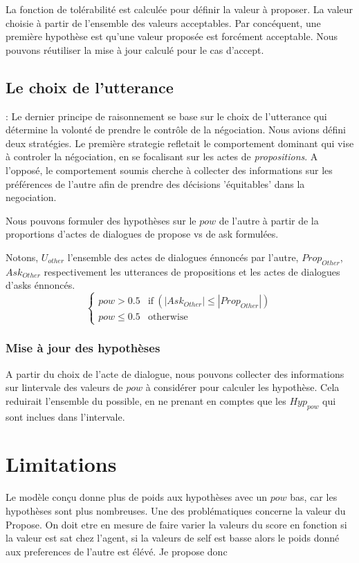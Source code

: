 \documentclass[runningheads,a4paper]{llncs}
\begin{document}
La fonction de tolérabilité est calculée pour définir la valeur à proposer. La valeur choisie à partir de l'ensemble des valeurs acceptables. Par concéquent, une première hypothèse est qu'une valeur proposée est forcément acceptable. Nous pouvons réutiliser la mise à jour calculé pour le cas d'accept.

\subsection{Le choix de l'utterance}: 
Le dernier principe de raisonnement se base sur le choix de l'utterance qui détermine la volonté de prendre le contrôle de la négociation. Nous avions défini deux stratégies. Le première strategie refletait le comportement dominant qui vise à controler la négociation, en se focalisant sur les actes de \emph{propositions}. A l'opposé, le comportement soumis cherche à collecter des informations sur les préférences de l'autre afin de prendre des décisions 'équitables' dans la negociation.

Nous pouvons formuler des hypothèses sur le $pow$ de l'autre à partir de la proportions d'actes de dialogues de propose vs de ask formulées.

Notons, $U_{other}$ l'ensemble des actes de dialogues énnoncés par l'autre, $Prop_{Other}$, $Ask_{Other}$ respectivement les utterances de propositions et les actes de dialogues d'asks énnoncés. 
\begin{equation}
\left\{\begin{array}{ll}
pow > 0.5 & \mathrm{if\ } (|Ask_{Other}| \leq |Prop_{Other}|)\\
pow\leq 0.5 & \mathrm{otherwise}
\end{array}\right.
\end{equation}

\subsubsection{Mise à jour des hypothèses}
A partir du choix de l'acte de dialogue, nous pouvons collecter des informations sur lintervale des valeurs de $pow$ à considérer pour calculer les hypothèse. Cela reduirait l'ensemble du possible, en ne prenant en comptes que les $Hyp_{pow}$ qui sont inclues dans l'intervale.

\section{Limitations}

Le modèle conçu donne plus de poids aux hypothèses avec un $pow$ bas, car les hypothèses sont plus nombreuses.
Une des problématiques concerne la valeur du Propose. On doit etre en mesure de faire varier la valeurs du score en fonction si la valeur est sat chez l'agent, si la valeurs de self est basse alors le poids donné aux preferences de l'autre est élévé.
Je propose donc 	
\end{document}
